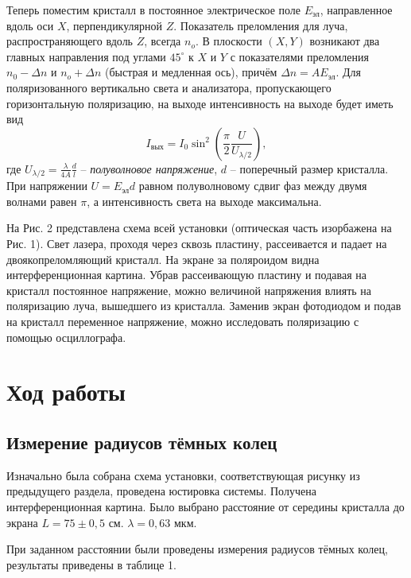 \documentclass[a4paper,12pt]{article} %
\begin{document}
Теперь поместим кристалл в постоянное электрическое поле $E_{\text{эл}}$, направленное вдоль оси $X$, перпендикулярной $Z$. Показатель преломления для луча, распространяющего вдоль $Z$, всегда $n_o$. В плоскости $(X,Y)$ возникают два главных направления под углами $45^\circ$ к $X$ и $Y$ с показателями преломления $n_0 - \Delta n$ и $n_o + \Delta n$ (быстрая и медленная ось), причём $\Delta n = A E_{\text{эл}}$. Для поляризованного вертикально света и анализатора, пропускающего горизонтальную поляризацию, на выходе интенсивность на выходе будет иметь вид
\begin{equation}
I_{\text{вых}} = I_0 \sin^2 \left(\dfrac{\pi}{2} \dfrac{U}{U_{\lambda/2}} \right),
\end{equation}
где $\displaystyle U_{\lambda/2} = \frac{\lambda}{4A}\frac{d}{l}$ -- \textit{полуволновое напряжение}, $d$ -- поперечный размер кристалла.  При напряжении $U = E_{\text{эл}}d$ равном полуволновому сдвиг фаз между двумя волнами равен $\pi$, а интенсивность света на выходе максимальна. 


На Рис. 2 представлена схема всей установки (оптическая часть изорбажена на Рис. 1). Свет лазера, проходя через сквозь пластину, рассеивается и падает на двоякопреломляющий кристалл. На экране за поляроидом видна интерференционная картина. Убрав рассеивающую пластину и подавая на кристалл постоянное напряжение, можно величиной напряжения влиять на поляризацию луча, вышедшего из кристалла. Заменив экран фотодиодом и подав на кристалл переменное напряжение, можно исследовать поляризацию с помощью осциллографа.
\section{Ход работы}
\subsection{Измерение радиусов тёмных колец}
Изначально была собрана схема установки, соответствующая рисунку из предыдущего раздела, проведена юстировка системы. Получена интерференционная картина. Было выбрано расстояние от середины кристалла до экрана $L =  75 \pm 0,5 $ см. $\lambda = 0,63$ мкм.

При заданном расстоянии были проведены измерения радиусов тёмных колец, результаты приведены в таблице 1.
\end{document}
